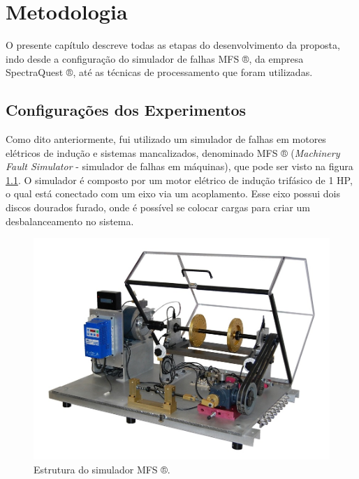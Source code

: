 
\chapter{Metodologia}

O presente capítulo descreve todas as etapas do desenvolvimento da proposta, indo desde a configuração do simulador de falhas MFS ®, da
empresa SpectraQuest ®, até as técnicas de processamento que foram utilizadas.

% 

\section{Configurações dos Experimentos}

Como dito anteriormente, fui utilizado um simulador de falhas em motores elétricos de indução e sistemas mancalizados, denominado
MFS ® (\textit{Machinery Fault Simulator} - simulador de falhas em máquinas), que pode ser visto na figura \ref{fig:real_plant}. O
simulador é composto por um motor elétrico de indução trifásico de 1 HP, o qual está conectado com um eixo via um acoplamento.
Esse eixo possui dois discos dourados furado, onde é possível se colocar cargas para criar um desbalanceamento no sistema.

\begin{figure}[H]
    \caption{Estrutura do simulador MFS ®.}
    \begin{center}
        \includegraphics[scale=.4]{metodologia/img/real_plant}
    \end{center}
    \label{fig:real_plant}
\end{figure}


